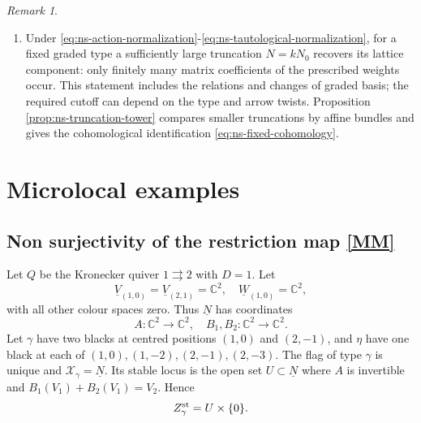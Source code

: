 \documentclass[11pt,reqno]{amsart}
\theoremstyle{definition}
\theoremstyle{remark}
\newtheorem{Remark}[Theorem]{Remark}
\def\bbC{\mathbb C}
\def\dN{\underline N}
\def\dV{\underline V}
\def\dW{\underline W}
\def\scrX{\mathscr X}
\begin{document}
\begin{Remark}
\begin{enumerate}[label=$\mathrm{(\alph*)}$,leftmargin=8mm]
graded dictionary, are the $\mathfrak L_{\rho,\gamma}$. Proposition \ref{prop:ns-crit} gives one such model
$$(T_\gamma,f_\gamma),$$
 but its fibres are not the graded triple quiver
varieties of \cite{VV23}.
\item Under \eqref{eq:ns-action-normalization}-\eqref{eq:ns-tautological-normalization}, for a fixed
graded type a sufficiently large truncation $N=kN_0$ recovers its
lattice component: only finitely many matrix
coefficients of the prescribed weights occur. This statement includes
the relations and changes of graded basis; the required cutoff can
depend on the type and arrow twists. Proposition
\ref{prop:ns-truncation-tower} compares smaller truncations by affine
bundles and gives the cohomological identification
\eqref{eq:ns-fixed-cohomology}.
\end{enumerate}
\end{Remark}

\fi%











\section{Microlocal examples}
\label{app:examples}


\subsection{Non surjectivity of the restriction map \eqref{MM}}
\label{ex:restriction-nonsurjective}
Let $Q$ be the Kronecker quiver $1\rightrightarrows2$ with $D=1$.
Let 
$$\dV_{(1,0)}=\dV_{(2,1)}=\bbC^2
,\quad
\dW_{(1,0)}=\bbC^2,$$
 with all other colour spaces zero.
Thus $\dN$ has coordinates
\[
 A:\bbC^2\to\bbC^2,\quad
 B_1,B_2:\bbC^2\to\bbC^2.
\]
Let $\gamma$ have two blacks at centred positions $(1,0)$ and
$(2,-1)$, and $\eta$ have one black at each of $(1,0),(1,-2),(2,-1),(2,-3)$.
The flag of type $\gamma$ is unique and $\scrX_\gamma=\dN$.
Its stable locus is the open set $U\subset\dN$ where $A$ is
invertible and $B_1(V_1)+B_2(V_1)=V_2$. Hence
$$Z_\gamma^{\rm st}=U\times\{0\}.$$
\end{document}
